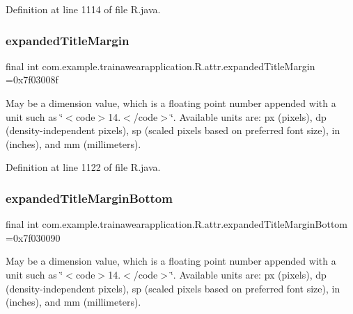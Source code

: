 Definition at line 1114 of file R.\+java.

\mbox{\label{classcom_1_1example_1_1trainawearapplication_1_1_r_1_1attr_aae0270732161082361df0f5c6324fdee}} 
\subsubsection{\texorpdfstring{expandedTitleMargin}{expandedTitleMargin}}
{\footnotesize\ttfamily final int com.\+example.\+trainawearapplication.\+R.\+attr.\+expanded\+Title\+Margin =0x7f03008f\hspace{0.3cm}{\ttfamily [static]}}

May be a dimension value, which is a floating point number appended with a unit such as \char`\"{}$<$code$>$14.\+5sp$<$/code$>$\char`\"{}. Available units are\+: px (pixels), dp (density-\/independent pixels), sp (scaled pixels based on preferred font size), in (inches), and mm (millimeters). 

Definition at line 1122 of file R.\+java.

\mbox{\label{classcom_1_1example_1_1trainawearapplication_1_1_r_1_1attr_a15b5f0e717b45b98eebe4c7308a129ae}} 
\subsubsection{\texorpdfstring{expandedTitleMarginBottom}{expandedTitleMarginBottom}}
{\footnotesize\ttfamily final int com.\+example.\+trainawearapplication.\+R.\+attr.\+expanded\+Title\+Margin\+Bottom =0x7f030090\hspace{0.3cm}{\ttfamily [static]}}

May be a dimension value, which is a floating point number appended with a unit such as \char`\"{}$<$code$>$14.\+5sp$<$/code$>$\char`\"{}. Available units are\+: px (pixels), dp (density-\/independent pixels), sp (scaled pixels based on preferred font size), in (inches), and mm (millimeters). 

